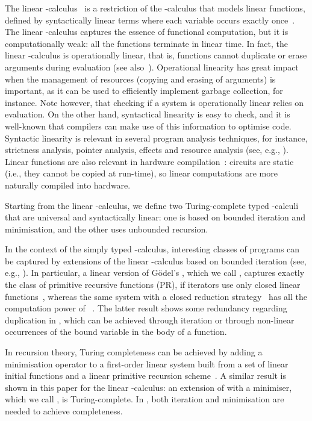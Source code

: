 \documentclass{article}
\begin{document}
The linear -calculus~\cite{AbramskyS:comill} is a restriction
of the -calculus that models linear functions, defined by
syntactically linear terms where each variable occurs
exactly once~\cite{Kfoury}. The linear -calculus captures the essence of
functional computation, but it is computationally weak: all the
functions terminate in linear time. In fact, the linear
-calculus is operationally linear, that is, functions cannot
duplicate or erase arguments during evaluation (see
also~\cite{alves05tcs,klop07}). Operational linearity has great impact
when the management of resources (copying and erasing of arguments) is
important, as it can be used to efficiently implement garbage
collection, for instance. Note however, that checking if a system is
operationally linear relies on evaluation. On the other hand,
syntactical linearity is easy to check, and it is well-known that
compilers can make use of this information to optimise code. Syntactic
linearity is relevant in several program analysis techniques, for
instance, strictness analysis, pointer analysis, effects and resource
analysis (see, e.g.,
\cite{BoudolG:semlcr,EhrhardT:difflc,Wansbrough00,Wadler90,David_WalkerChapter,NoekerConcurrentClean,HofmannJ03,EggerMS09}). Linear
functions are also relevant in hardware compilation~\cite{Ghica07}:
circuits are static (i.e., they cannot be copied at run-time), so
linear computations are more naturally compiled into hardware.

Starting from the linear -calculus, we define two 
Turing-complete typed -calculi that are
universal and syntactically linear: one is based on bounded iteration
and minimisation, and the other uses unbounded recursion.

In the context of the simply typed -calculus, interesting
classes of programs can be captured by extensions of the linear
-calculus based on bounded iteration (see, e.g.,
\cite{G98,GirardJY:boull,AR02,BM04,H99,L04,T01}). In particular, a
linear version of G\"odel's \ST, which we call \LLCI, captures exactly
the class of primitive recursive functions (PR), if iterators use only
closed linear functions~\cite{Lago05}, whereas the same system with a
closed reduction strategy~\cite{fernandezM:clores} has all the
computation power of \ST~\cite{AlvesS:TCS}. The latter result shows
some redundancy regarding duplication in \ST, which can be achieved
through iteration or through non-linear occurrences of the bound
variable in the body of a function.

In recursion theory, Turing completeness can be achieved by adding a
minimisation operator to  a first-order linear system built
from a set of linear initial functions and a linear primitive
recursion scheme~\cite{DBLP:conf/birthday/AlvesFFM07}.
A similar result is shown in this paper for the linear -calculus:
an extension of \LLCI with a minimiser, which we call \LLCIm, is Turing-complete.
In \LLCIm,  both iteration and minimisation are needed to achieve completeness.
\end{document}
